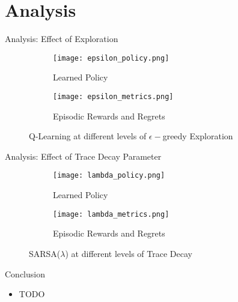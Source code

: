 \section{Analysis}

\begin{frame}{Analysis: Effect of Exploration}
\begin{figure}
    \centering
    \begin{subfigure}{\textwidth}
        \centering
        \texttt{[image: epsilon\_policy.png]}
        \caption{Learned Policy}
    \end{subfigure}
    \begin{subfigure}{\textwidth}
        \centering
        \texttt{[image: epsilon\_metrics.png]}
        \caption{Episodic Rewards and Regrets}
    \end{subfigure}
    \caption{Q-Learning at different levels of $\epsilon-$greedy Exploration}
\end{figure}
\end{frame}

\begin{frame}{Analysis: Effect of Trace Decay Parameter}
\begin{figure}
    \centering
    \begin{subfigure}{\textwidth}
        \centering
        \texttt{[image: lambda\_policy.png]}
        \caption{Learned Policy}
    \end{subfigure}
    \begin{subfigure}{\textwidth}
        \centering
        \texttt{[image: lambda\_metrics.png]}
        \caption{Episodic Rewards and Regrets}
    \end{subfigure}
    \caption{SARSA($\lambda$) at different levels of Trace Decay}
\end{figure}
\end{frame}

\begin{frame}{Conclusion}
\begin{itemize}
    \item TODO
\end{itemize}
\end{frame}
